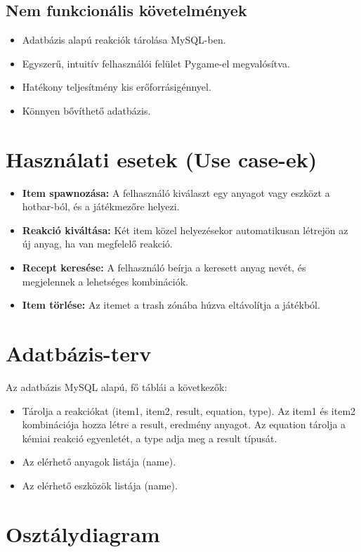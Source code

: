 \documentclass[]{thesis-ekf}
\begin{document}
	\subsection{Nem funkcionális követelmények}
	\begin{itemize}
		\item Adatbázis alapú reakciók tárolása MySQL-ben.
		\item Egyszerű, intuitív felhasználói felület Pygame-el megvalósítva.
		\item Hatékony teljesítmény kis erőforrásigénnyel.
		\item Könnyen bővíthető adatbázis.
	\end{itemize}
	
	
	\section{Használati esetek (Use case-ek)}
	\begin{itemize}
		\item \textbf{Item spawnozása:} A felhasználó kiválaszt egy anyagot vagy eszközt a hotbar-ból, és a játékmezőre helyezi.
		\item \textbf{Reakció kiváltása:} Két item közel helyezésekor automatikusan létrejön az új anyag, ha van megfelelő reakció.
		\item \textbf{Recept keresése:} A felhasználó beírja a keresett anyag nevét, és megjelennek a lehetséges kombinációk.
		\item \textbf{Item törlése:} Az itemet a trash zónába húzva eltávolítja a játékból.
	\end{itemize}
	\section{Adatbázis-terv}
	
	Az adatbázis MySQL alapú, fő táblái a következők:
	\begin{itemize}
		\item  Tárolja a reakciókat (item1, item2, result, equation, type). Az item1 és item2 kombinációja hozza létre a result, eredmény anyagot. Az equation tárolja a kémiai reakció egyenletét, a type adja meg a result típusát.
		\item  Az elérhető anyagok listája (name).
		\item  Az elérhető eszközök listája (name).
	\end{itemize}
	
	\section{Osztálydiagram}
	
\end{document}

